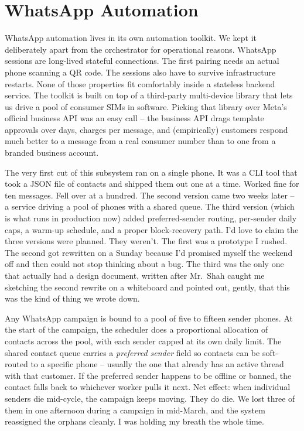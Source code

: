\section{WhatsApp Automation}
\label{sec:whatsapp}
WhatsApp automation lives in its own automation toolkit. We kept it deliberately apart from the orchestrator for operational reasons. WhatsApp sessions are long-lived stateful connections. The first pairing needs an actual phone scanning a QR code. The sessions also have to survive infrastructure restarts. None of those properties fit comfortably inside a stateless backend service. The toolkit is built on top of a third-party multi-device library that lets us drive a pool of consumer SIMs in software. Picking that library over Meta's official business API was an easy call -- the business API drags template approvals over days, charges per message, and (empirically) customers respond much better to a message from a real consumer number than to one from a branded business account.

The very first cut of this subsystem ran on a single phone. It was a CLI tool that took a JSON file of contacts and shipped them out one at a time. Worked fine for ten messages. Fell over at a hundred. The second version came two weeks later -- a service driving a pool of phones with a shared queue. The third version (which is what runs in production now) added preferred-sender routing, per-sender daily caps, a warm-up schedule, and a proper block-recovery path. I'd love to claim the three versions were planned. They weren't. The first was a prototype I rushed. The second got rewritten on a Sunday because I'd promised myself the weekend off and then could not stop thinking about a bug. The third was the only one that actually had a design document, written after Mr.~Shah caught me sketching the second rewrite on a whiteboard and pointed out, gently, that this was the kind of thing we wrote down.

Any WhatsApp campaign is bound to a pool of five to fifteen sender phones. At the start of the campaign, the scheduler does a proportional allocation of contacts across the pool, with each sender capped at its own daily limit. The shared contact queue carries a {\em preferred sender} field so contacts can be soft-routed to a specific phone -- usually the one that already has an active thread with that customer. If the preferred sender happens to be offline or banned, the contact falls back to whichever worker pulls it next. Net effect: when individual senders die mid-cycle, the campaign keeps moving. They do die. We lost three of them in one afternoon during a campaign in mid-March, and the system reassigned the orphans cleanly. I was holding my breath the whole time.

